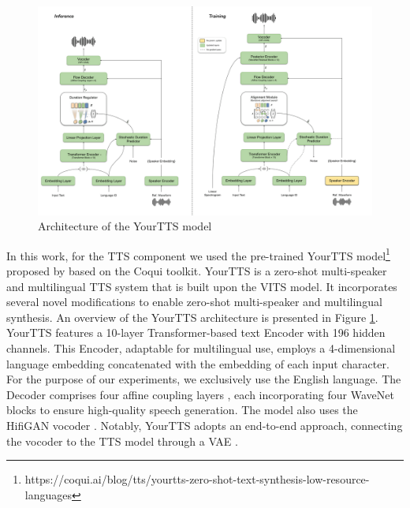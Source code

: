 \begin{figure}
    \begin{center}
        \includegraphics[scale=0.4]{imgs/YourTTS.png}
        \caption{Architecture of the YourTTS model\protect\footnotemark}
        \label{fig:YourTTS}
    \end{center}
\end{figure}

In this work, for the \ac{TTS} component we used the pre-trained YourTTS model\footnote{https://coqui.ai/blog/tts/yourtts-zero-shot-text-synthesis-low-resource-languages} proposed by \cite{casanova2022yourtts} based on the  Coqui toolkit. YourTTS is a zero-shot multi-speaker and multilingual \ac{TTS} system that is built upon the \ac{VITS} model. It incorporates several novel modifications to enable zero-shot multi-speaker and multilingual synthesis. An overview of the YourTTS architecture is presented in Figure \ref{fig:YourTTS}.
YourTTS features a 10-layer Transformer-based text Encoder with 196 hidden channels. This Encoder, adaptable for multilingual use, employs a 4-dimensional language embedding concatenated with the embedding of each input character. For the purpose of our experiments, we exclusively use the English language. The Decoder comprises four affine coupling layers \cite{45819}, each incorporating four WaveNet blocks \cite{45774} to ensure high-quality speech generation. The model also uses the HifiGAN vocoder \cite{kong2020hifi}. Notably, YourTTS adopts an end-to-end approach, connecting the vocoder to the \ac{TTS} model through a \ac{VAE} \cite{VAE}.


